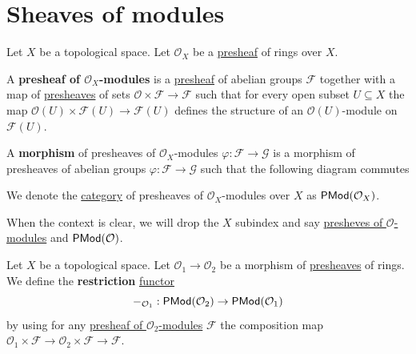 \documentclass[../../../main]{subfiles}
\begin{document}
\section{Sheaves of modules} \label{sec:sheaves-of-modules}

\begin{definition} \label{def:presheaf-of-modules}
  Let \(X\) be a topological space.
  Let \(\mathcal{O}_{X}\) be a \hyperref[def:presheaf]{presheaf} of rings over \(X\).

  A \textbf{presheaf of \(\mathcal{O}_{X}\)-modules} is a \hyperref[def:presheaf]{presheaf} of abelian groups \(\mathcal{F}\) together with a map of \hyperref[def:presheaf]{presheaves} of sets \(\mathcal{O} \times \mathcal{F} \to \mathcal{F}\) such that for every open subset \(U \subseteq X\) the map \(\mathcal{O}(U) \times \mathcal{F}(U) \to \mathcal{F}(U)\) defines the structure of an \(\mathcal{O}(U)\)-module on \(\mathcal{F}(U)\).

  A \textbf{morphism} of presheaves of \(\mathcal{O}_{X}\)-modules \(\varphi: \mathcal{F} \to \mathcal{G}\) is a morphism of presheaves of abelian groups \(\varphi: \mathcal{F} \to \mathcal{G}\) such that the following diagram commutes
  \begin{center}
  \end{center}

  We denote the \hyperref[def:category]{category} of presheaves of \(\mathcal{O}_{X}\)-modules over \(X\) as \(\mathsf{PMod}(\mathcal{O}_{X})\).
\end{definition}

\begin{notation}
  When the context is clear, we will drop the \(X\) subindex and say \hyperref[def:presheaf-of-modules]{presheves of \(\mathcal{O}\)-modules} and \(\mathsf{PMod}(\mathcal{O})\).
\end{notation}


\begin{definition} \label{def:restriction-presheaf-of-modules}
  Let \(X\) be a topological space.
  Let \(\mathcal{O}_{1} \to \mathcal{O}_{2}\) be a morphism of \hyperref[def:presheaf]{presheaves} of rings.
  We define the \textbf{restriction} \hyperref[def:functor]{functor}
  \begin{equation*}
    -_{\mathcal{O}_{1}}: \mathsf{PMod}(\mathcal{O}_{2}) \to \mathsf{PMod}(\mathcal{O}_{1})
  \end{equation*}
  by using for any \hyperref[def:presheaf-of-modules]{presheaf of \(\mathcal{O}_{2}\)-modules} \(\mathcal{F}\) the composition map \(\mathcal{O}_{1} \times \mathcal{F} \to \mathcal{O}_{2} \times \mathcal{F} \to \mathcal{F}\).
\end{definition}
\end{document}

